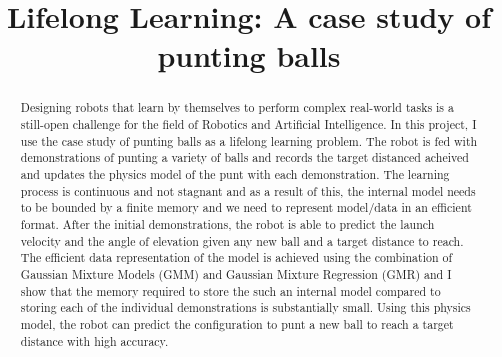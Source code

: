 \documentclass[conference]{IEEEtran}
\begin{document}
%
\title{Lifelong Learning: A case study of punting balls}


\author{
}


% 

\maketitle

\begin{abstract}
Designing robots that learn by themselves to perform complex real-world tasks is a still-open challenge for the field of Robotics and Artificial Intelligence. In this project, I use the case study of punting balls as a lifelong learning problem. The robot is fed with demonstrations of punting a variety of balls and records the target distanced acheived and updates the physics model of the punt with each demonstration. The learning process is continuous and not stagnant and as a result of this, the internal model needs to be bounded by a finite memory and we need to represent model/data in an efficient format. After the initial demonstrations, the robot is able to predict the launch velocity and the angle of elevation given any new ball and a target distance to reach. The efficient data representation of the model is achieved using the combination of Gaussian Mixture Models (GMM) and Gaussian Mixture Regression (GMR) and I show that the memory required to store the such an internal model compared to storing each of the individual demonstrations is substantially small. Using this physics model, the robot can predict the configuration to punt a new ball to reach a target distance with high accuracy.
\end{abstract}
\end{document}
